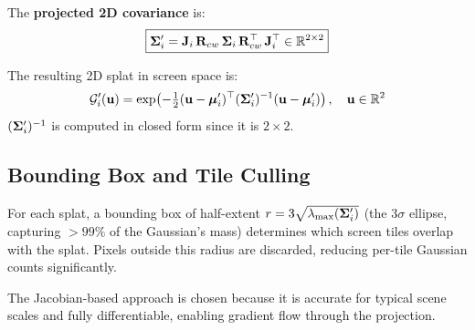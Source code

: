 The \textbf{projected 2D covariance} is:
\begin{equation}
  \boxed{
    \boldsymbol{\Sigma}'_i = \mathbf{J}_i\,\mathbf{R}_{cw}\,\boldsymbol{\Sigma}_i\,\mathbf{R}_{cw}^\top\,\mathbf{J}_i^\top
    \in \mathbb{R}^{2\times 2}
  }
  \label{eq:cov_proj}
\end{equation}

The resulting 2D splat in screen space is:
\begin{equation}
  \mathcal{G}'_i(\mathbf{u}) =
    \exp\!\left(
      -\tfrac{1}{2}(\mathbf{u} - \boldsymbol{\mu}'_i)^\top(\boldsymbol{\Sigma}'_i)^{-1}(\mathbf{u} - \boldsymbol{\mu}'_i)
    \right), \quad \mathbf{u} \in \mathbb{R}^2
\end{equation}
$(\boldsymbol{\Sigma}'_i)^{-1}$ is computed in closed form since it is $2\times2$.

\subsection{Bounding Box and Tile Culling}

For each splat, a bounding box of half-extent $r = 3\sqrt{\lambda_{\max}(\boldsymbol{\Sigma}'_i)}$
(the $3\sigma$ ellipse, capturing $>99\%$ of the Gaussian's mass) determines
which screen tiles overlap with the splat. Pixels outside this radius are
discarded, reducing per-tile Gaussian counts significantly.

The Jacobian-based approach is chosen because it is accurate for typical scene
scales and fully differentiable, enabling gradient flow through the projection.
